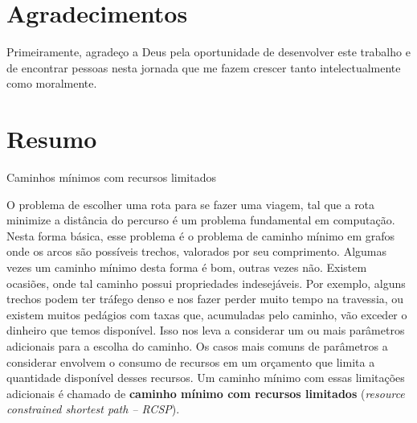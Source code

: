 \documentclass[12pt,twoside,a4paper]{book}
\begin{document}
      



\chapter*{Agradecimentos}

Primeiramente, agradeço a Deus pela oportunidade de desenvolver este trabalho
e de encontrar pessoas nesta jornada que me fazem crescer tanto intelectualmente
como moralmente.


\chapter*{Resumo}

\begin{center}
  \Large{Caminhos mínimos com recursos limitados}
\end{center}

O problema de escolher uma rota para se fazer uma viagem, tal que a rota 
minimize a distância do percurso é um problema fundamental em 
computação. Nesta forma básica, esse problema é o problema de caminho 
mínimo em grafos onde os arcos são possíveis trechos, valorados por seu 
comprimento. Algumas vezes um caminho mínimo desta forma é bom, outras 
vezes não. Existem ocasiões, onde tal caminho possui propriedades 
indesejáveis. Por exemplo, alguns trechos podem ter tráfego denso e nos 
fazer perder muito tempo na travessia, ou existem muitos pedágios com 
taxas que, acumuladas pelo caminho, vão exceder o dinheiro que temos 
disponível.  Isso nos leva a considerar um ou mais parâmetros adicionais 
para a escolha do caminho.  Os casos mais comuns de parâmetros a 
considerar envolvem o consumo de recursos em um orçamento que limita a 
quantidade disponível desses recursos. Um caminho mínimo com essas 
limitações adicionais é chamado de {\bf caminho mínimo com recursos 
limitados } ({\it resource constrained shortest path -- \textsc{RCSP}}). 
\end{document}
